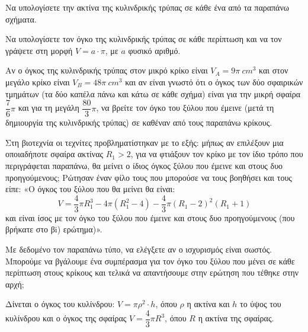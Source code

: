 \begin{alist}
\item

\begin{rlist}
\item Να υπολογίσετε την ακτίνα της κυλινδρικής τρύπας σε κάθε ένα από τα παραπάνω σχήματα.
\item Να υπολογίσετε τον όγκο της κυλινδρικής τρύπας σε κάθε περίπτωση και να τον γράψετε στη μορφή $V = a \cdot \pi$, με $a$ φυσικό αριθμό.
\end{rlist}
\item

\begin{rlist}
\item Αν ο όγκος της κυλινδρικής τρύπας στον μικρό κρίκο είναι $V_A = 9\pi\ cm^{3}$ και στον μεγάλο κρίκο είναι $V_B = 48\pi\ cm^{3}$ και αν είναι γνωστό ότι ο όγκος των δύο σφαιρικών τμημάτων (τα δύο καπέλα πάνω και κάτω σε κάθε σχήμα) είναι για την μικρή σφαίρα $\dfrac{7}{6}\pi$ και για τη μεγάλη $\dfrac{80}{3}\pi$, να βρείτε τον όγκο του ξύλου που έμεινε (μετά τη δημιουργία της κυλινδρικής τρύπας) σε καθέναν από τους παραπάνω κρίκους.
\item Στη βιοτεχνία οι τεχνίτες προβληματίστηκαν με το εξής: μήπως αν επιλέξουν μια οποιαδήποτε σφαίρα ακτίνας $R_1 > 2$, για να φτιάξουν τον κρίκο με τον ίδιο τρόπο που περιγράφεται παραπάνω, θα μείνει ο ίδιος όγκος ξύλου που έμεινε και στους δυο προηγούμενους; Ρώτησαν έναν φίλο τους που μπορούσε να τους βοηθήσει και τους είπε: «Ο όγκος του ξύλου που θα μείνει θα είναι:
\begin{equation*}
V = \dfrac{4}{3}\pi R_1^{3} - 4\pi\left(R_1^{2} - 4\right) - \dfrac{4}{3}\pi\left(R_1 - 2\right)^{2}\left(R_1 + 1\right)
\end{equation*}
και είναι ίσος με τον όγκο του ξύλου που έμεινε και στους δυο προηγούμενους (που βρήκατε στο βi) ερώτημα)».

Με δεδομένο τον παραπάνω τύπο, να ελέγξετε αν ο ισχυρισμός είναι σωστός. Μπορούμε να βγάλουμε ένα συμπέρασμα για τον όγκο του ξύλου που μένει σε κάθε περίπτωση στους κρίκους και τελικά να απαντήσουμε στην ερώτηση που τέθηκε στην αρχή;


Δίνεται ο όγκος του κυλίνδρου: $V = \pi\rho^{2} \cdot h$, όπου $\rho$ η ακτίνα και $h$ το ύψος του κυλίνδρου και ο όγκος της σφαίρας $V = \dfrac{4}{3}\pi R^{3}$, όπου $R$ η ακτίνα της σφαίρας.
\end{rlist}
\end{alist}

